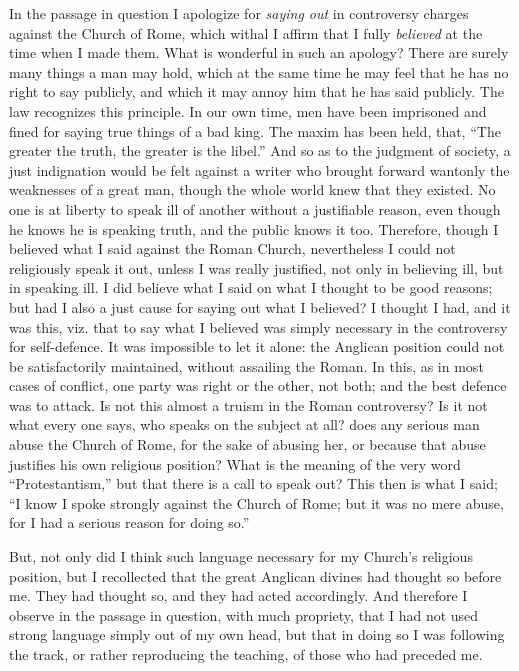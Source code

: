 In the
passage in question I apologize for \emph{saying out} in controversy charges against the Church of
Rome, which withal I affirm that I fully \emph{believed} at the time
when I made them. What is wonderful in such an apology? There are surely many things a man may hold, which at the
same time he may feel that he has no right to say publicly, and
which it may annoy him that he has said publicly. The law recognizes
this principle. In our own time, men have been imprisoned and fined for
saying true things of a bad king. The maxim has been held, that,
``The greater the truth, the greater is the libel.'' And so as
to the judgment of society, a just indignation would be felt against a
writer who brought forward wantonly the weaknesses of a great man,
though the whole world knew that they existed. No one is at liberty to
speak ill of another without a justifiable reason, even though he knows
he is speaking truth, and the public knows it too. Therefore, though
I believed what I said against the Roman Church, nevertheless I
could not religiously speak it out, unless
I was really justified, not only in believing ill, but in speaking ill. I did
believe what I said on what I thought to be good reasons; but
had I also a just cause for saying out what I
believed? I thought I
had, and it was this, viz. that to say what I believed was
simply necessary in the controversy for
self-defence.
It was impossible to let it alone:
the Anglican position could not be satisfactorily maintained, without
assailing the Roman. In this, as in most
cases of conflict, one party was right or the other, not both; and the best
defence was to attack. Is not this almost a truism in the Roman
controversy? Is it not what every one says, who speaks on the
subject at all? does any serious man abuse the Church of Rome, for the
sake of abusing her, or because that abuse justifies his own religious
position? What is the meaning of the very word
``Protestantism,'' but that there is a call to speak out? This
then is what I said; ``I know I spoke strongly against the Church of
Rome; but it was no mere abuse, for I had a serious reason for doing
so.''

But, not only did I think such language necessary for my Church's
religious position, but I recollected that the great Anglican
divines had thought so before me. They had thought so, and they had
acted accordingly. And therefore I observe in the passage in
question, with much propriety, that I had not used strong language simply out of my own head, but that
in doing so I was following
the track, or rather reproducing the teaching, of those who had preceded
me.

